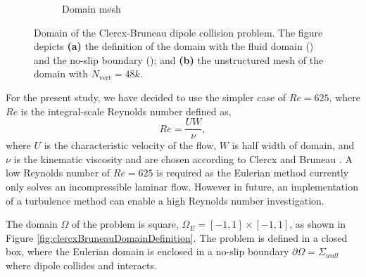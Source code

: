 \begin{figure}[!b]
\begin{subfigure}[t]{0.45\textwidth}
             \caption{Domain mesh}
             \label{fig:clercxBruneauDomainMesh}
     \end{subfigure}
     \caption{Domain of the Clercx-Bruneau dipole collision problem. The figure depicts \textbf{(a)} the definition of the domain with the fluid domain ({}) and the no-slip boundary ({}); and \textbf{(b)} the unstructured mesh of the domain with $N_{\mathrm{vert}} = 48k$.}
     \label{fig:clercxBruneauDomain}
	\end{figure}

For the present study, we have decided to use the simpler case of $Re=625$, where $Re$ is the integral-scale Reynolds number defined as,
	\begin{equation}
	Re = \frac{UW}{\nu},
	\end{equation}
where $U$ is the characteristic velocity of the flow, $W$ is half width of domain, and $\nu$ is the kinematic viscosity and are chosen according to Clercx and Bruneau \cite{Clercx2006a}. A low Reynolds number of $Re=625$ is required as the Eulerian method currently only solves an incompressible laminar flow. However in future, an implementation of a turbulence method can enable a high Reynolds number investigation.

The domain $\Omega$ of the problem is square, $\Omega_E = [-1,1]\times[-1,1]$, as shown in Figure \ref{fig:clercxBruneauDomainDefinition}. The problem is defined in a closed box, where the Eulerian domain is enclosed in a no-slip boundary $\partial{\Omega} = \Sigma_{wall}$ where dipole collides and interacts.

